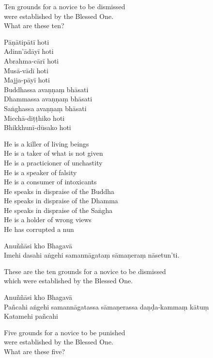 \begin{english}
  Ten grounds for a novice to be dismissed\\
  were established by the Blessed One.\\
  What are these ten?
\end{english}

Pāṇātipātī hoti\\
Adinn'ādāyī hoti\\
Abrahma-cārī hoti\\
Musā-vādī hoti\\
Majja-pāyī hoti\\
Buddhassa avaṇṇaṃ bhāsati\\
Dhammassa avaṇṇaṃ bhāsati\\
Saṅghassa avaṇṇaṃ bhāsati\\
Micchā-diṭṭhiko hoti\\
Bhikkhunī-dūsako hoti

\begin{english}
  He is a killer of living beings\\
  He is a taker of what is not given\\
  He is a practicioner of unchastity\\
  He is a speaker of falsity\\
  He is a consumer of intoxicants\\
  He speaks in dispraise of the Buddha\\
  He speaks in dispraise of the Dhamma\\
  He speaks in dispraise of the Saṅgha\\
  He is a holder of wrong views\\
  He has corrupted a nun
\end{english}

Anuññāsi kho Bhagavā\\
Imehi dasahi aṅgehi samannāgataṃ sāmaṇeraṃ nāsetun'ti.

\begin{english}
  These are the ten grounds for a novice to be dismissed\\
  which were established by the Blessed One.
\end{english}


Anuññāsi kho Bhagavā\\
Pañcahi aṅgehi samannāgatassa sāmaṇerassa daṇḍa-kammaṃ kātuṃ\\
Katamehi pañcahi

\begin{english}
  Five grounds for a novice to be punished\\
  were established by the Blessed One.\\
  What are these five?
\end{english}

